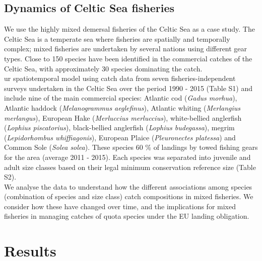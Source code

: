 \documentclass[fleqn,10pt]{wlscirep}
\begin{document}
\begin{linenumbers}
\subsection*{Dynamics of Celtic Sea fisheries\\}

We use the highly mixed demersal fisheries of the Celtic Sea as a case study.
The Celtic Sea is a temperate sea where fisheries are spatially and temporally
complex; mixed fisheries are undertaken by several nations using different gear
types\cite{Ellis2000, Gerritsen2012}. Close to 150 species have been
identified in the commercial catches of the Celtic Sea, with approximately 30
species dominating the catch\cite{Mateo2016}.\\

ur spatiotemporal model
 using catch data from seven
fisheries-independent surveys undertaken in the Celtic Sea over the period 1990
- 2015 (Table S1) and include nine of the main commercial species: Atlantic cod
(\textit{Gadus morhua}), Atlantic haddock (\textit{Melanogrammus aeglefinus}),
Atlantic whiting (\textit{Merlangius merlangus}), European Hake
(\textit{Merluccius merluccius}), white-bellied anglerfish (\textit{Lophius
	piscatorius}), black-bellied anglerfish (\textit{Lophius budegassa}),
megrim (\textit{Lepidorhombus whiffiagonis}), European Plaice
(\textit{Pleuronectes platessa}) and Common Sole (\textit{Solea solea}). These
species 
60 \% of landings by towed fishing gears for the area (average 2011 -
2015\cite{STECF2017}). Each species was separated into juvenile and adult size
classes based on their legal minimum conservation reference size (Table S2).\\

We analyse the data to understand how the different associations among species
(combination of species and size class)  catch
compositions  in mixed fisheries. We
consider how these have changed over time, and the implications for mixed
fisheries in managing catches of quota species under the EU landing
obligation.\\

\section*{Results\\}


\end{linenumbers}
\end{document}
